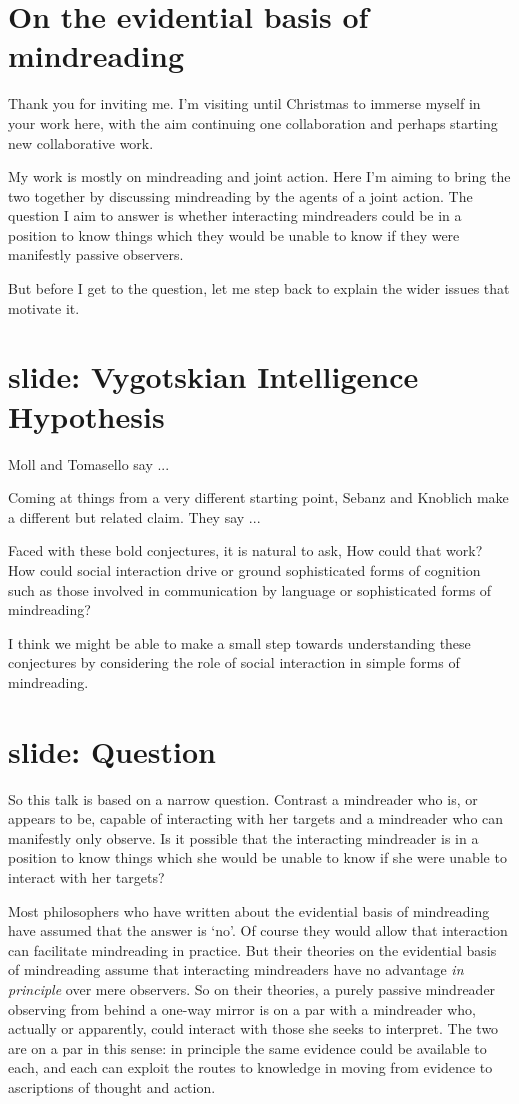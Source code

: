 \documentclass[12pt,\papersize]{extarticle}
\begin{document}
\section{On the evidential basis of mindreading}
\label{sec:intro}

Thank you for inviting me.  I’m visiting until Christmas to immerse myself in your work here, with the aim continuing one collaboration and perhaps starting new collaborative work.  

My work is mostly on mindreading and joint action.
Here I'm aiming to bring the two together by discussing mindreading by the agents of a joint action.
The question I aim to answer is  whether interacting mindreaders could  be in a position to know things which they would be unable to know if they were manifestly passive observers.

But before I get to the question,
 let me step back to explain the wider issues that motivate it.


\section{slide: Vygotskian Intelligence Hypothesis}
Moll and Tomasello say ...

Coming at things from a very different starting point, 
Sebanz and Knoblich make a different but related claim.  
They say ...

Faced with these bold conjectures, it is natural to ask,
How could that work?
How could social interaction drive or ground sophisticated forms of cognition such as those involved in communication by language or sophisticated forms of mindreading?

I think we might be able to make a small step towards understanding these conjectures by considering the role of  social interaction in simple forms of mindreading.

\section{slide: Question}
So this talk is based on a narrow question.
Contrast
a mindreader who is, or appears to be, capable of interacting with her targets 
and
a mindreader who can manifestly only observe.
Is it possible that the interacting mindreader is in a position to know things which she would be unable to know if she were unable to interact with her targets?

Most philosophers who have written about the evidential basis of mindreading have assumed that the answer is `no'.
Of course they would allow that interaction can facilitate mindreading in practice.
But their theories on the evidential basis of mindreading assume that interacting mindreaders have no advantage \emph{in principle} over mere observers.
So on their theories,
a purely passive mindreader observing from behind a one-way mirror
is on a par with
a mindreader who, actually or apparently, could interact with those she seeks to interpret.
The two are on a par in this sense:
in principle the same evidence could be available to each, and each can exploit the routes to knowledge in moving from evidence to ascriptions of thought and action.
\end{document}
